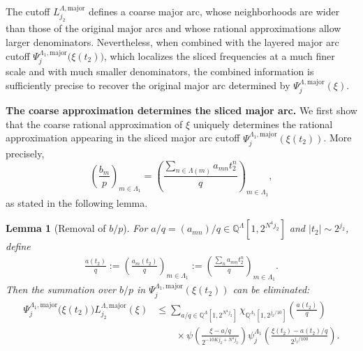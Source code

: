 \documentclass[11 pt,letterpaper]{amsart}
\theoremstyle{plain}
\newtheorem{lemma}{Lemma}\numberwithin{lemma}{section}
\theoremstyle{definition}
\theoremstyle{remark} \theoremstyle{exam} \theoremstyle{ob}
\numberwithin{equation}{section}
\begin{document}
The cutoff $L^{\Lambda,\mathrm{major}}_{j_2}$ defines a coarse major arc, whose neighborhoods are wider than those of the original major arcs and whose rational approximations allow larger denominators. Nevertheless, when combined with the layered major arc cutoff
$\Psi^{\Lambda_1,\mathrm{major}}_{j}\bigl(\xi(t_2)\bigr)$,
which localizes the sliced frequencies at a much finer scale and with much smaller denominators, the combined information is sufficiently precise to recover the original major arc determined by
$\Psi^{\Lambda,\mathrm{major}}_{j}(\xi)$.

\medskip

\noindent
{\bf The coarse approximation determines the sliced major arc.}
We first show that the coarse rational approximation of $\xi$ uniquely determines the rational approximation appearing in the sliced major arc cutoff
$\Psi_j^{\Lambda_1,\mathrm{major}}(\xi(t_2))$.
More precisely,
\[
\left(\frac{b_m}{p}\right)_{m\in\Lambda_1}
=
\left(
\frac{\sum_{n\in\Lambda(m)}a_{mn}t_2^n}{q}
\right)_{m\in\Lambda_1},
\]
as stated in the following lemma.

\begin{lemma}[Removal of $b/p$]\label{lem31}
For
$a/q=(a_{mn})/q\in\mathbb{Q}^{\Lambda}[1,2^{N^4j_2}]$
and $|t_2|\sim2^{j_2}$, define
\begin{align*}
\frac{a(t_2)}{q}
:=
\left(
\frac{a_m(t_2)}{q}
\right)_{m\in\Lambda_1}
:=
\left(
\frac{\sum_n a_{mn}t_2^n}{q}
\right)_{m\in\Lambda_1}.
\end{align*}
Then the summation over $b/p$ in
$\Psi_j^{\Lambda_1,\mathrm{major}}(\xi(t_2))$
can be eliminated:
\begin{align}\label{345}
\Psi^{\Lambda_1,\mathrm{major}}_{j}\bigl(\xi(t_2)\bigr)
L^{\Lambda,\mathrm{major}}_{j_2}(\xi)
&\le
\sum_{a/q\in\mathbb Q^\Lambda[1,2^{N^4j_2}]}
\chi_{\mathbb Q^{\Lambda_1}[1,2^{j_2/10}]}
\!\left(\frac{a(t_2)}{q}\right)
\\
&\qquad\times
\psi\!\left(
\frac{\xi-a/q}{2^{-10Kj_2+N^4j_2}}
\right)
\psi^{\Lambda_1}_{j}\!\left(
\frac{\xi(t_2)-a(t_2)/q}{2^{j_2/100}}
\right).\nonumber
\end{align}


 

 
\end{lemma}
\end{document}
